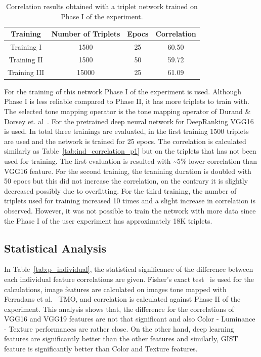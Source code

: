 \begin{table}[ht]
\caption{Correlation results obtained with a triplet network trained on Phase I of the experiment.}
\label{tab:triplet}
\centering
\begin{tabular}{c|c c c}
    \textbf{Training} & \textbf{Number of Triplets} & \textbf{Epocs} & \textbf{Correlation}  \\
\hline
    Training I & 1500 & 25 & 60.50 \\
    Training II & 1500 & 50 & 59.72 \\
    Training III & 15000 & 25 & 61.09
\end{tabular}
\end{table}

For the training of this network Phase I of the experiment is used. Although Phase I is less reliable compared to Phase II, it has more triplets to train with. The selected tone mapping operator is the tone mapping operator of Durand \& Dorsey et. al~\cite{durand2002fast}. For the pretrained deep neural network for DeepRanking VGG16 is used. In total three trainings are evaluated, in the first training 1500 triplets are used and the network is trained for 25 epocs. The correlation is calculated similarly as Table~\ref{tab:ind_correlation_p1} but on the triplets that has not been used for training. The first evaluation is resulted with \textasciitilde 5\% lower correlation than VGG16 feature. For the second training, the tranining duration is doubled with 50 epocs but this did not increase the correlation, on the contrary it is slightly decreased possibly due to overfitting. For the third training, the number of triplets used for training increased 10 times and a slight increase in correlation is observed. However, it was not possible to train the network with more data since the Phase I of the user experiment has approximately 18K triplets.


\subsection{Statistical Analysis}
In Table~\ref{tab:p_individual}, the statistical significance of the difference between each individual feature correlations are given. Fisher's exact test~\cite{fisher1922interpretation} is used for the calculations, image features are calculated on images tone mapped with Ferradans et al.~\cite{ferradans2011analysis} TMO, and correlation is calculated against Phase II of the experiment. This analysis shows that, the difference for the correlations of VGG16 and VGG19 features are not that significant and also Color - Luminance - Texture performances are rather close. On the other hand, deep learning features are significantly better than the other features and similarly, GIST feature is significantly better than Color and Texture features.


